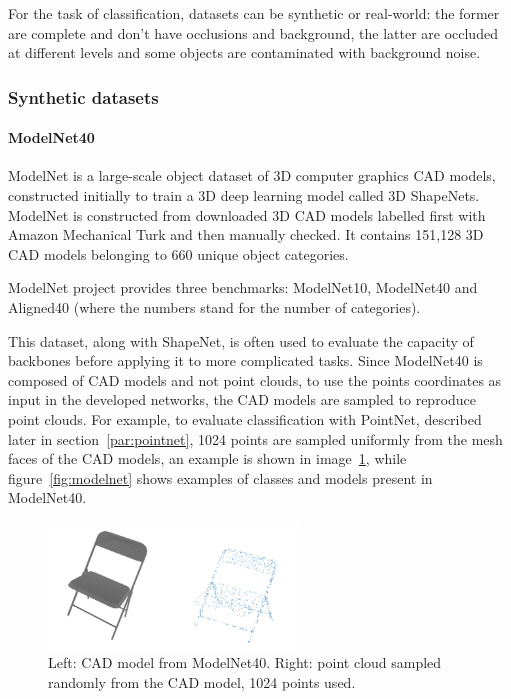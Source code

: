 For the task of classification, datasets can be synthetic or real-world: the former are complete and don't have occlusions and background, the latter are occluded at different levels and some objects are contaminated with background noise. 

\subsubsection{Synthetic datasets}

\paragraph{ModelNet40~\cite{ShapeNets}}
\label{ModNet40}
ModelNet is a large-scale object dataset of 3D computer graphics CAD models, constructed initially to train a 3D deep learning model called 3D ShapeNets. ModelNet is constructed from downloaded 3D CAD models labelled first with Amazon Mechanical Turk and then manually checked. It contains 151,128 3D CAD models belonging to 660 unique object categories. 

ModelNet project provides three benchmarks: ModelNet10, ModelNet40 and Aligned40 (where the numbers stand for the number of categories). 


This dataset, along with ShapeNet, is often used to evaluate the capacity of backbones before applying it to more complicated tasks. Since ModelNet40 is composed of CAD models and not point clouds, to use the points coordinates as input in the developed networks, the CAD models are sampled to reproduce point clouds. For example, to evaluate classification with PointNet, described later in section~\ref{par:pointnet}, 1024 points are sampled uniformly from the mesh faces of the CAD models, an example is shown in image~\ref{fig:modelnet_sampled}, while figure~\ref{fig:modelnet} shows examples of classes and models present in ModelNet40.

\begin{figure}[hbt]
    \centering
    \includegraphics[width=0.6\textwidth]{images/cad_pointcloud.png}
    \caption{Left: CAD model from ModelNet40. Right: point cloud sampled randomly from the CAD model, 1024 points used.}
    \label{fig:modelnet_sampled}
\end{figure}

